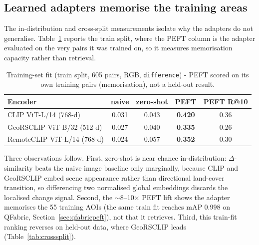 \documentclass{article}
\begin{document}
\subsection{Learned adapters memorise the training areas}
\label{sec:memorisation}

The in-distribution and cross-split measurements isolate why the adapters do not
generalise. Table~\ref{tab:indist} reports the train split, where the PEFT column
is the adapter evaluated on the very pairs it was trained on, so it measures
memorisation capacity rather than retrieval.

\begin{table}[H]
    \centering
    \caption{Training-set fit (train split, 605 pairs, RGB, \texttt{difference}) -
    PEFT scored on its own training pairs (memorisation), not a held-out result.}
    \label{tab:indist}
    \begin{tabular}{lcccc}
        \toprule
        \textbf{Encoder} & \textbf{naive} & \textbf{zero-shot} & \textbf{PEFT} & \textbf{PEFT R@10} \\
        \midrule
        CLIP ViT-L/14 (768-d)       & 0.031 & 0.043 & \textbf{0.420} & 0.36 \\
        GeoRSCLIP ViT-B/32 (512-d)  & 0.027 & 0.040 & \textbf{0.335} & 0.26 \\
        RemoteCLIP ViT-L/14 (768-d) & 0.024 & 0.057 & \textbf{0.352} & 0.30 \\
        \bottomrule
    \end{tabular}
\end{table}

Three observations follow. First, zero-shot is near chance in-distribution:
$\Delta$-similarity beats the naive image baseline only marginally, because CLIP
and GeoRSCLIP embed scene appearance rather than directional land-cover
transition, so differencing two normalised global embeddings discards the
localised change signal. Second, the $\sim$8--10$\times$ PEFT lift shows the
adapter memorises the 55 training AOIs (the same train fit reaches mAP 0.998 on
QFabric, Section~\ref{sec:qfabricpeft}), not that it retrieves. Third, this
train-fit ranking reverses on held-out data, where GeoRSCLIP leads
(Table~\ref{tab:crosssplit}).
\end{document}
